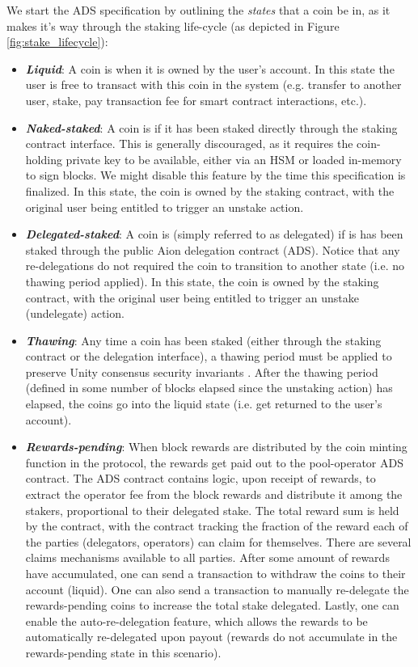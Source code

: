 We start the ADS specification by outlining the \textit{states} that a coin be in, as it makes it's way through the staking life-cycle (as depicted in Figure \ref{fig:stake_lifecycle}):
\begin{itemize}
    \item \textbf{\textit{Liquid}}: A coin is  when it is owned by the user's account. In this state the user is free to transact with this coin in the system (e.g. transfer to another user, stake, pay transaction fee for smart contract interactions, etc.).
    \item \textbf{\textit{Naked-staked}}: A coin is  if it has been staked directly through the staking contract interface. This is generally discouraged, as it requires the coin-holding private key to be available, either via an HSM or loaded in-memory to sign blocks. We might disable this feature by the time this specification is finalized. In this state, the coin is owned by the staking contract, with the original user being entitled to trigger an unstake action.  
    \item \textbf{\textit{Delegated-staked}}: A coin is  (simply referred to as delegated) if is has been staked through the public Aion delegation contract (ADS). Notice that any re-delegations do not required the coin to transition to another state (i.e. no thawing period applied). In this state, the coin is owned by the staking contract, with the original user being entitled to trigger an unstake (undelegate) action.  
    \item \textbf{\textit{Thawing}}: Any time a coin has been staked (either through the staking contract or the delegation interface), a thawing period must be applied to preserve Unity consensus security invariants \cite{WZS19}. After the thawing period (defined in some number of blocks elapsed since the unstaking action) has elapsed, the coins go into the liquid state (i.e. get returned to the user's account). 
    \item \textbf{\textit{Rewards-pending}}: When block rewards are distributed by the coin minting function in the protocol, the rewards get paid out to the pool-operator ADS contract. The ADS contract contains logic, upon receipt of rewards, to extract the operator fee from the block rewards and distribute it among the stakers, proportional to their delegated stake. The total reward sum is held by the contract, with the contract tracking the fraction of the reward each of the parties (delegators, operators) can claim for themselves. There are several claims mechanisms available to all parties. After some amount of rewards have accumulated, one can send a transaction to withdraw the coins to their account (liquid). One can also send a transaction to manually re-delegate the rewards-pending coins to increase the total stake delegated. Lastly, one can enable the auto-re-delegation feature, which allows the rewards to be automatically re-delegated upon payout (rewards do not accumulate in the rewards-pending state in this scenario). 
\end{itemize}

